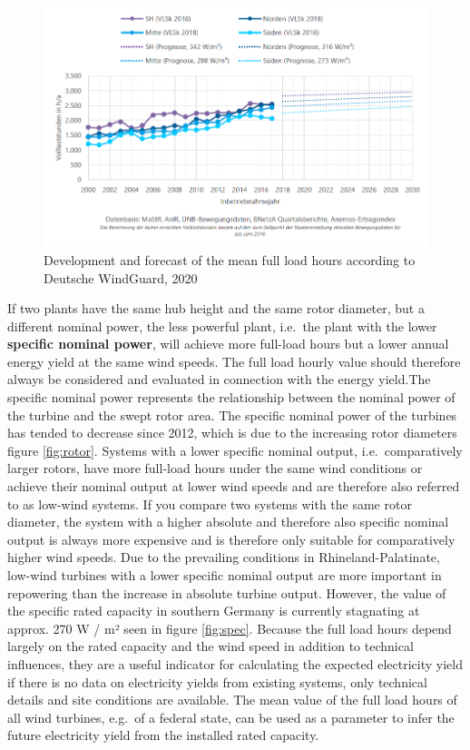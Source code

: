 \documentclass[a4paper,11pt]{article}
\begin{document}
\begin{figure}

{\centering \includegraphics[width=1\linewidth]{figures/DWG/DWG_Volllaststunden} 

}

\caption{Development and forecast of the mean full load hours according to Deutsche WindGuard, 2020}\label{fig:flh}
\end{figure}
If two plants have the same hub height and the same rotor diameter, but a different nominal power, the less powerful plant, i.e.~the plant with the lower \textbf{specific nominal power}, will achieve more full-load hours but a lower annual energy yield at the same wind speeds. The full load hourly value should therefore always be considered and evaluated in connection with the energy yield.The specific nominal power represents the relationship between the nominal power of the turbine and the swept rotor area. The specific nominal power of the turbines has tended to decrease since 2012, which is due to the increasing rotor diameters figure \ref{fig:rotor}. Systems with a lower specific nominal output, i.e.~comparatively larger rotors, have more full-load hours under the same wind conditions or achieve their nominal output at lower wind speeds and are therefore also referred to as low-wind systems. If you compare two systems with the same rotor diameter, the system with a higher absolute and therefore also specific nominal output is always more expensive and is therefore only suitable for comparatively higher wind speeds. Due to the prevailing conditions in Rhineland-Palatinate, low-wind turbines with a lower specific nominal output are more important in repowering than the increase in absolute turbine output. However, the value of the specific rated capacity in southern Germany is currently stagnating at approx. 270 W / m² seen in figure \ref{fig:spec}. Because the full load hours depend largely on the rated capacity and the wind speed in addition to technical influences, they are a useful indicator for calculating the expected electricity yield if there is no data on electricity yields from existing systems, only technical details and site conditions are available. The mean value of the full load hours of all wind turbines, e.g.~of a federal state, can be used as a parameter to infer the future electricity yield from the installed rated capacity.
\end{document}
